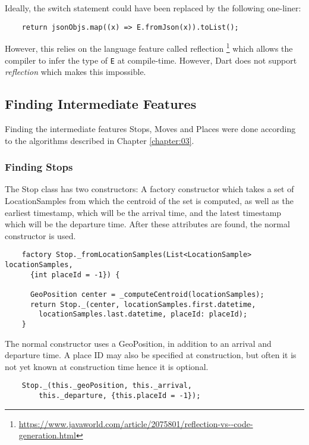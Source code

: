 Ideally, the switch statement could have been replaced by the following one-liner:
\begin{verbatim}
    return jsonObjs.map((x) => E.fromJson(x)).toList();
\end{verbatim}

However, this relies on the language feature called reflection \footnote{\url{https://www.javaworld.com/article/2075801/reflection-vs--code-generation.html}} which allows the compiler to infer the type of \verb|E| at compile-time. However, Dart does not support \textit{reflection} which makes this impossible.

\subsection{Finding Intermediate Features}
Finding the intermediate features Stops, Moves and Places were done according to the algorithms described in Chapter \ref{chapter:03}. 

\subsubsection{Finding Stops}
The Stop class has two constructors: A factory constructor which takes a set of LocationSamples from which the centroid of the set is computed, as well as the earliest timestamp, which will be the arrival time, and the latest timestamp which will be the departure time. After these attributes are found, the normal constructor is used.

\begin{verbatim}
    factory Stop._fromLocationSamples(List<LocationSample> locationSamples,
      {int placeId = -1}) {
      
      GeoPosition center = _computeCentroid(locationSamples);
      return Stop._(center, locationSamples.first.datetime,
        locationSamples.last.datetime, placeId: placeId);
    }
\end{verbatim}

The normal constructor uses a GeoPosition, in addition to an arrival and departure time. A place ID may also be specified at construction, but often it is not yet known at construction time hence it is optional.

\begin{verbatim}
    Stop._(this._geoPosition, this._arrival, 
        this._departure, {this.placeId = -1});
\end{verbatim}

